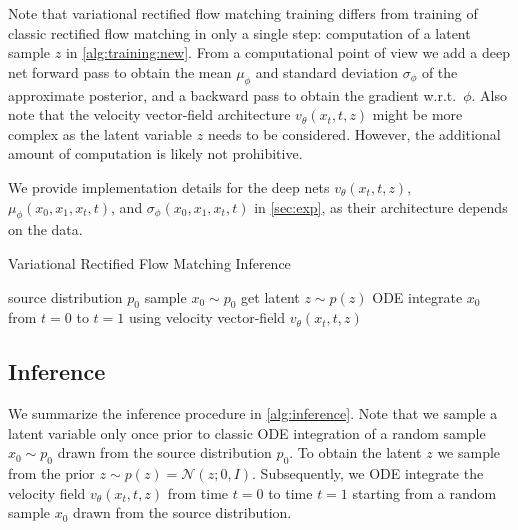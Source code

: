 Note that variational rectified flow matching training differs from training of classic rectified flow matching in only a single step: computation of a latent sample $z$ in \cref{alg:training:new}. From a computational point of view we add a deep net forward pass  to obtain the mean $\mu_\phi$ and standard deviation $\sigma_\phi$ of the approximate posterior, and a backward pass to obtain the gradient w.r.t.\ $\phi$. Also note that the velocity vector-field architecture $v_\theta(x_t,t,z)$ might be more complex as the latent variable $z$ needs to be considered. However, the additional amount of computation is likely not prohibitive. %



We provide implementation details for the deep nets $v_\theta(x_t,t,z)$, $\mu_\phi(x_0,x_1,x_t,t)$, and $\sigma_\phi(x_0,x_1,x_t,t)$ in \cref{sec:exp}, as their architecture depends on the data.





\begin{algorithm}[t]

\caption{Variational Rectified Flow Matching Inference}\label{alg:inference}
\begin{algorithmic}
    source distribution $p_0$
   \STATE sample $x_0\sim p_0$\;
   \STATE get latent $z\sim p(z)$\;
   \STATE ODE integrate $x_0$ from $t=0$ to $t=1$ using velocity vector-field $v_\theta(x_t,t,z)$\;
\end{algorithmic}

\end{algorithm}


\subsection{Inference}
\label{sec:method:infer}




We summarize the inference procedure in \cref{alg:inference}. Note that we sample a latent variable only once prior to classic ODE integration of a random sample $x_0\sim p_0$ drawn from the source distribution $p_0$. To obtain the latent $z$ we sample from the prior $z \sim p(z) = \mathcal{N}(z; 0,I)$. Subsequently, we ODE integrate the velocity field $v_\theta(x_t,t,z)$ from time $t = 0$ to time $t = 1$ starting from a random sample $x_0$ drawn from the source distribution.



